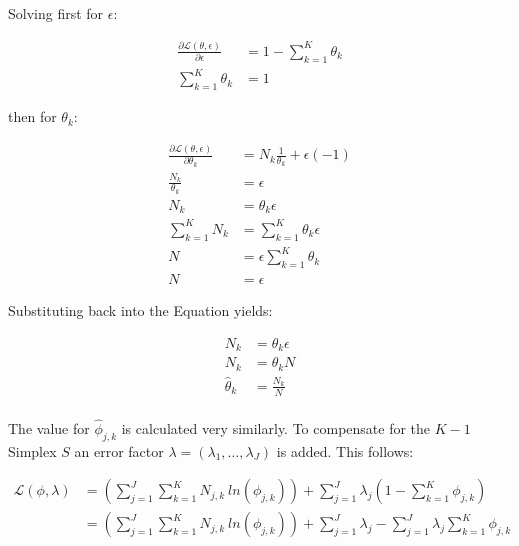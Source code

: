 Solving first for $\epsilon$:

\begin{equation}
    \begin{split}
        \frac{\partial \mathcal{L}(\theta, \epsilon)}{\partial \epsilon} &= 1 - \sum_{k=1}^{K} \theta_{k}  \\
        \sum_{k=1}^{K} \theta_{k}  &= 1
    \end{split}
\end{equation}

then for $\theta_{k}$:

\begin{equation}
    \begin{split}
        \frac{\partial \mathcal{L}(\theta, \epsilon)}{\partial \theta_{k}} &=  N_{k} \frac{1}{\theta_{k}}  + \epsilon(-1) \\
        \frac{N_{k}}{\theta_{k}} &= \epsilon \\
        N_{k} &= \theta_{k} \epsilon \\
        \sum_{k=1}^{K} N_{k} &= \sum_{k=1}^{K} \theta_{k} \epsilon \\
        N &= \epsilon \sum_{k=1}^{K} \theta_{k} \\
        N &= \epsilon
    \end{split}
\end{equation}

Substituting back into the Equation yields:

\begin{equation}
    \begin{split}
        N_{k} &= \theta_{k} \epsilon \\
        N_{k} &= \theta_{k} N \\
        \hat{\theta}_{k} &= \frac{N_{k}}{N}\\
    \end{split}
\end{equation}

The value for $\hat{\phi}_{j, k} $ is calculated very similarly. To compensate for the $K-1$ Simplex $S$ an error factor $\lambda = (\lambda_{1}, \dots, \lambda_{J})$ is added. This follows:

\begin{equation}
    \begin{split}
        \mathcal{L}(\phi, \lambda) 
        &=  \left( \sum_{j=1}^{J} \sum_{k=1}^{K} N_{j,k} \ ln \left( \phi_{j,k} \right) \right) + \sum_{j=1}^{J} \lambda_{j} \left( 1 - \sum_{k=1}^{K} \phi_{j,k} \right) \\
        &=  \left( \sum_{j=1}^{J} \sum_{k=1}^{K} N_{j,k} \ ln \left( \phi_{j,k} \right) \right) + \sum_{j=1}^{J} \lambda_{j} - \sum_{j=1}^{J} \lambda_{j} \sum_{k=1}^{K} \phi_{j,k} \\
    \end{split}
\end{equation}

